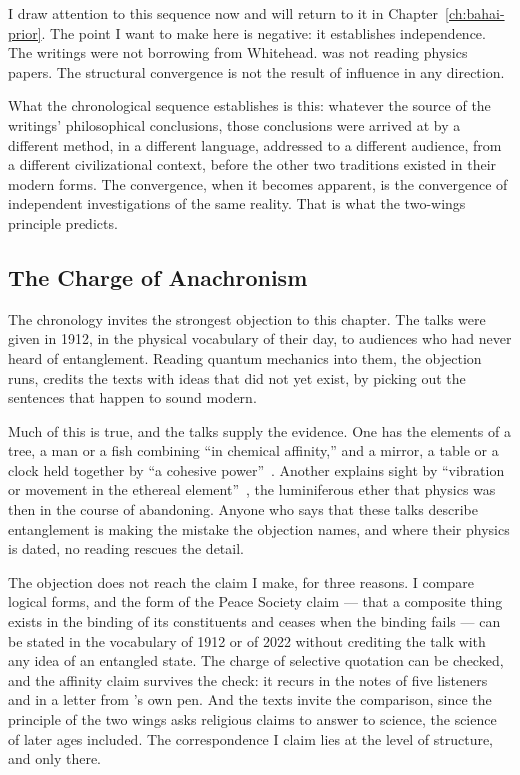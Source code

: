 I draw attention to this sequence now and will return to it in
Chapter~\ref{ch:bahai-prior}.
The point I want to make here is negative: it establishes independence.
The \bahai writings were not borrowing from Whitehead.
\AbdulBaha was not reading physics papers.
The structural convergence is not the result of influence in any direction.

What the chronological sequence establishes is this: whatever the source of
the \bahai writings' philosophical conclusions, those conclusions were arrived
at by a different method, in a different language, addressed to a different
audience, from a different civilizational context, before the other two
traditions existed in their modern forms.
The convergence, when it becomes apparent, is the convergence of independent
investigations of the same reality.
That is what the two-wings principle predicts.

\subsection*{The Charge of Anachronism}

The chronology invites the strongest objection to this chapter.
The talks were given in 1912, in the physical vocabulary of their day, to
audiences who had never heard of entanglement.
Reading quantum mechanics into them, the objection runs, credits the texts
with ideas that did not yet exist, by picking out the sentences that happen to
sound modern.

Much of this is true, and the talks supply the evidence.
One has the elements of a tree, a man or a fish combining ``in chemical
affinity,'' and a mirror, a table or a clock held together by ``a cohesive
power''~\citep[Talk~74]{PUP}.
Another explains sight by ``vibration or movement in the ethereal
element''~\citep[Talk~58]{PUP}, the luminiferous ether that physics was then
in the course of abandoning.
Anyone who says that these talks describe entanglement is making the mistake
the objection names, and where their physics is dated, no reading rescues the
detail.

The objection does not reach the claim I make, for three reasons.
I compare logical forms, and the form of the Peace Society claim --- that a
composite thing exists in the binding of its constituents and ceases when the
binding fails --- can be stated in the vocabulary of 1912 or of 2022 without
crediting the talk with any idea of an entangled state.
The charge of selective quotation can be checked, and the affinity claim
survives the check: it recurs in the notes of five listeners and in a letter
from \AbdulBaha's own pen.
And the texts invite the comparison, since the principle of the two wings asks
religious claims to answer to science, the science of later ages included.
The correspondence I claim lies at the level of structure, and only there.

